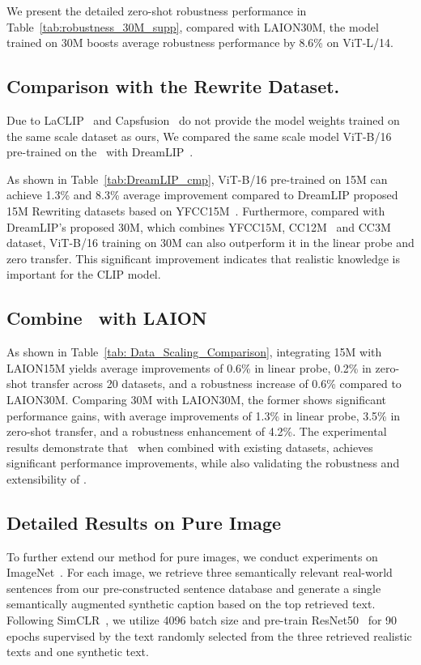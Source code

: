  We present the detailed zero-shot robustness performance in Table~\ref{tab:robustness_30M_supp}, compared with LAION30M, the model trained on \dsname30M boosts average robustness performance by 8.6\% on ViT-L/14.

\subsection{Comparison with the Rewrite Dataset.} 
Due to LaCLIP~\cite{laclip} and Capsfusion~\cite{yu2024capsfusion} do not provide the model weights trained on the same scale dataset as ours, We compared the same scale model ViT-B/16 pre-trained on the \dsname\ with DreamLIP~\cite{DreamLIP}.

As shown in Table~\ref{tab:DreamLIP_cmp}, ViT-B/16 pre-trained on \dsname15M can achieve 1.3\% and 8.3\% average improvement compared to DreamLIP proposed 15M Rewriting datasets based on YFCC15M~\cite{YFCC100M}. Furthermore, compared with DreamLIP's proposed 30M, which combines YFCC15M, CC12M~\cite{CC12M} and CC3M~\cite{CC12M} dataset, ViT-B/16 training on \dsname30M can also outperform it in the linear probe and zero transfer. This significant improvement indicates that realistic knowledge is important for the CLIP model.

\subsection{Combine \dsname\ with LAION}
As shown in Table~\ref{tab: Data_Scaling_Comparison}, integrating \dsname15M with LAION15M yields average improvements of 0.6\% in linear probe, 0.2\% in zero-shot transfer across 20 datasets, and a robustness increase of 0.6\% compared to LAION30M. Comparing \dsname30M with LAION30M, the former shows significant performance gains, with average improvements of 1.3\% in linear probe, 3.5\% in zero-shot transfer, and a robustness enhancement of 4.2\%. The experimental results demonstrate that \dsname\, when combined with existing datasets, achieves significant performance improvements, while also validating the robustness and extensibility of \dsname.





\subsection{Detailed Results on Pure Image}
To further extend our method for pure images, we conduct experiments on ImageNet~\cite{ImageNet}. For each image, we retrieve three semantically relevant real-world sentences from our pre-constructed sentence database and generate a single semantically augmented synthetic caption based on the top retrieved text. Following SimCLR~\cite{chen2020simple}, we utilize 4096 batch size and pre-train ResNet50~\cite{he2016deep} for 90 epochs supervised by the text randomly selected from the three retrieved realistic texts and one synthetic text.


